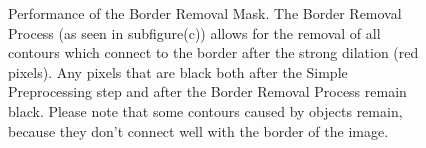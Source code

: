 \documentclass[12pt]{article}
\begin{document}
	\begin{figure}[htp]
		\centering
		\quad
		
		\quad
		
		\caption{Performance of the Border Removal Mask.
		The Border Removal Process (as seen in subfigure(c)) allows for the removal of all contours which connect to the border after the strong dilation (red pixels).
		Any pixels that are black both after the Simple Preprocessing step and after the Border Removal Process remain black.		
		Please note that some contours caused by objects remain, because they don't connect well with the border of the image.}
		\label{fig:BorderRemoval}
	\end{figure}
	
\end{document}
